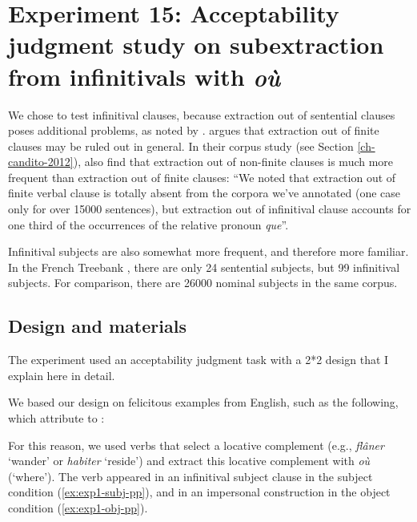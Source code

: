 \section[head=Experiment 15]{Experiment 15: Acceptability judgment study on subextraction from infinitivals with \emph{où}}
\label{ch:exp15}

We chose to test infinitival clauses, because extraction out of sentential clauses poses additional problems, as noted by \citet{Kluender.2004}. 
\citet[63]{Godard.1988} argues that extraction out of finite clauses may be ruled out in general. In their corpus study (see Section \ref{ch-candito-2012}), \citet{Candito.2012.ldd} also find that extraction out of non-finite clauses is much more frequent than extraction out of finite clauses: ``We noted that extraction out of finite verbal clause is totally absent from the corpora we've annotated (one case only for over 15000 sentences), but
extraction out of infinitival clause accounts for one third of the occurrences of the relative pronoun \emph{que}''.

Infinitival subjects are also somewhat more frequent, and therefore more familiar. In the French Treebank \citep{Abeille.2019.FTB}, there are only 24 sentential subjects, but 99 infinitival subjects. For comparison, there are 26000 nominal subjects in the same corpus.

\subsection{Design and materials}

The experiment used an acceptability judgment task with a 2*2 design that I explain here in detail. 

We based our design on felicitous examples from English, such as the following, which \citet[105]{Chaves.2020.UDC} attribute to \citet[72]{Grosu.1981}:

\eal
{}
\zl 

For this reason, we used verbs that select a locative complement (e.g., \emph{flâner} `wander' or \emph{habiter} `reside') and extract this locative complement with \emph{où} (`where'). The verb appeared in an infinitival subject clause in the subject condition (\ref{ex:exp1-subj-pp}), and in an impersonal construction in the object condition (\ref{ex:exp1-obj-pp}). 

